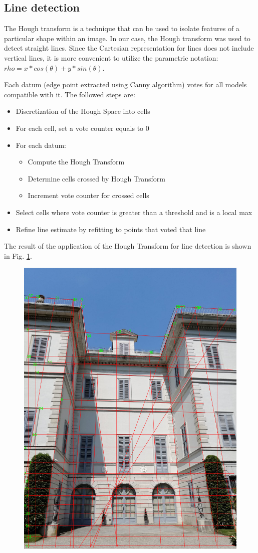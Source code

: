 \documentclass[11pt, oneside]{article}
\begin{document}
\subsection{Line detection}
The Hough transform is a technique that can be used to isolate features of a particular shape within an image. In our case, the Hough transform was used to detect straight lines. Since the Cartesian representation for lines does not include vertical lines, it is more convenient to utilize the parametric notation:
$ rho = x*cos(\theta) + y*sin(\theta) $.

Each datum (edge point extracted using Canny algorithm) votes for all models compatible with it. The followed steps are:
\begin{itemize}
	\item Discretization of the Hough Space into cells
	\item For each cell, set a vote counter equals to 0
	\item For each datum:
		\begin{itemize}
			\item Compute the Hough Transform
			\item Determine cells crossed by Hough Transform
			\item Increment vote counter for crossed cells
		\end{itemize}
	\item Select cells where vote counter is greater than a threshold and is a local max
	\item Refine line estimate by refitting to points that voted that line
\end{itemize}
The result of the application of the Hough Transform for line detection is shown in Fig. \ref{image_lines}.
\begin{figure}[!h]
	\centering
	\includegraphics[width=0.3766\linewidth]{image_lines.png}
	\label{image_lines}
\end{figure}
\end{document}
